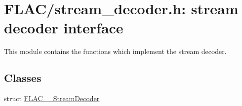 \hypertarget{group__flac__stream__decoder}{}\section{F\+L\+A\+C/stream\+\_\+decoder.h\+: stream decoder interface}
\label{group__flac__stream__decoder}


This module contains the functions which implement the stream decoder.  


\subsection*{Classes}
\begin{DoxyCompactItemize}
\item 
struct \hyperlink{struct_f_l_a_c_____stream_decoder}{F\+L\+A\+C\+\_\+\+\_\+\+Stream\+Decoder}
\end{DoxyCompactItemize}
